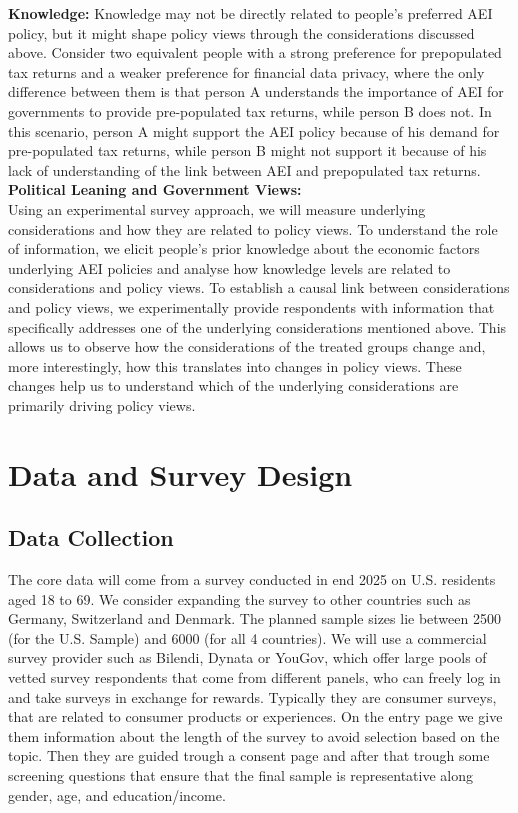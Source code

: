 \documentclass[11pt]{article}
\begin{document}
\textbf{Knowledge:} Knowledge may not be directly related to people's preferred AEI policy, but it might shape policy views through the considerations discussed above. Consider two equivalent people with a strong preference for prepopulated tax returns and a weaker preference for financial data privacy, where the only difference between them is that person A understands the importance of AEI for governments to provide pre-populated tax returns, while person B does not. In this scenario, person A might support the AEI policy because of his demand for pre-populated tax returns, while person B might not support it because of his lack of understanding of the link between AEI and prepopulated tax returns. \\[0.5em]
\textbf{Political Leaning and Government Views:} \\[-0.5em]

Using an experimental survey approach, we will measure underlying considerations and how they are related to policy views. To understand the role of information, we elicit people's prior knowledge about the economic factors underlying AEI policies and analyse how knowledge levels are related to considerations and policy views. To establish a causal link between considerations and policy views, we experimentally provide respondents with information that specifically addresses one of the underlying considerations mentioned above.  This allows us to observe how the considerations of the treated groups change and, more interestingly, how this translates into changes in policy views. These changes help us to understand which of the underlying considerations are primarily driving policy views. 
\section{Data and Survey Design}
\subsection{Data Collection}
The core data will come from a survey conducted in end 2025 on U.S. residents aged 18 to 69. We consider expanding the survey to other countries such as Germany, Switzerland and Denmark. The planned sample sizes lie between 2500 (for the U.S. Sample) and 6000 (for all 4 countries). We will use a commercial survey provider such as Bilendi, Dynata or YouGov, which offer large pools of vetted survey respondents that come from different panels, who can freely log in and take surveys in exchange for rewards. Typically they are consumer surveys, that are related to consumer products or experiences. On the entry page we give them information about the length of the survey to avoid selection based on the topic. Then they are guided trough a consent page and after that trough some screening questions that ensure that the final sample is representative along gender, age, and education/income. 
\end{document}
